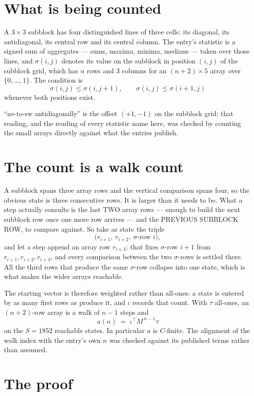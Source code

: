 \documentclass[11pt,a4paper]{article}
\theoremstyle{plain}
\theoremstyle{definition}
\begin{document}
\section{What is being counted}

A $3\times3$ subblock has four distinguished lines of three cells: its diagonal, its
antidiagonal, its central row and its central column. The entry's statistic is a signed sum of
aggregates --- sums, maxima, minima, medians --- taken over those lines, and $\sigma(i,j)$
denotes its value on the subblock in position $(i,j)$ of the subblock grid, which has $n$ rows
and $3$ columns for an $(n+2)\times5$ array over $\{0,\dots,1\}$. The condition is
\[
\sigma(i,j)\le\sigma(i,j+1),\qquad \sigma(i,j)\le\sigma(i+1,j)
\]
whenever both positions exist.

``ne-to-sw antidiagonally'' is the offset $(+1,-1)$ on the subblock grid; that reading, and
the reading of every statistic name here, was checked by counting the small arrays directly
against what the entries publish.

\section{The count is a walk count}

A subblock spans three array rows and the vertical comparison spans four, so the obvious state
is three consecutive rows. It is larger than it needs to be. What a step actually consults is
the last TWO array rows --- enough to build the next subblock row once one more row arrives ---
and the PREVIOUS SUBBLOCK ROW, to compare against. So take as state the triple
\[
\bigl(r_{i+1},\ r_{i+2},\ \sigma\text{-row }i\bigr),
\]
and let a step append an array row $r_{i+3}$: that fixes $\sigma$-row $i+1$ from
$r_{i+1},r_{i+2},r_{i+3}$, and every comparison between the two $\sigma$-rows is settled
there. All the third rows that produce the same $\sigma$-row collapse into one state, which is
what makes the wider arrays reachable.

The starting vector is therefore weighted rather than all-ones: a state is entered by as many
first rows as produce it, and $\iota$ records that count. With $\tau$ all-ones, an
$(n+2)$-row array is a walk of $n-1$ steps and
\[
a(n)\;=\;\iota^{\!\top}M^{\,n-1}\tau
\]
on the $S=1852$ reachable states. In particular $a$ is $C$-finite. The alignment of the walk
index with the entry's own $n$ was checked against its published terms rather than assumed.

\section{The proof}
\end{document}
